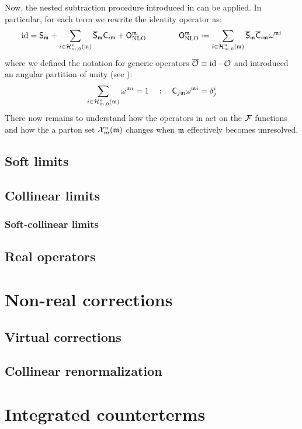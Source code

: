 
Now, the nested subtraction procedure introduced in \cite{rontsch-2017} can be applied. In particular, for each term we rewrite the identity operator as:
\begin{equation}
  \id = \so_\ur + \sum_{i \in \prt{n}{m}(\ur)} \oso_\ur \co_{i\ur} + \nlo^\ur
  \qquad \qquad
  \nlo^\ur \defeq \sum_{i \in \prt{n}{m}(\ur)} \oso_\ur \oco_{i\ur} \omega^{\ur i}
  \label{eq:nest-sub}
\end{equation}
where we defined the notation for generic operators $ \overline{\mathcal{O}} \equiv \operatorname{id} - \mathcal{O} $ and introduced an angular partition of unity (see ):
\begin{equation}
  \sum_{i \in \mathcal{H}^{n}_{m,0}(\mathfrak{m})} \omega^{\mathfrak{m} i} = 1
  \quad : \quad
  \mathsf{C}_{j\mathfrak{m}} \omega^{\mathfrak{m} i} = \delta_j^i
  \label{eq:omega-part}
\end{equation}
There now remains to understand how the operators in  act on the $ \mathcal{F} $ functions and how the a parton set $ \mathcal{X}^{n}_{m}(\mathfrak{m}) $ changes when $ \mathfrak{m} $ effectively becomes unresolved.

\subsection{Soft limits}

\subsection{Collinear limits}

\subsubsection{Soft-collinear limits}

\subsection{Real operators}

\section{Non-real corrections}

\subsection{Virtual corrections}

\subsection{Collinear renormalization}
\label{ssec:coll-ren}

\section{Integrated counterterms}










